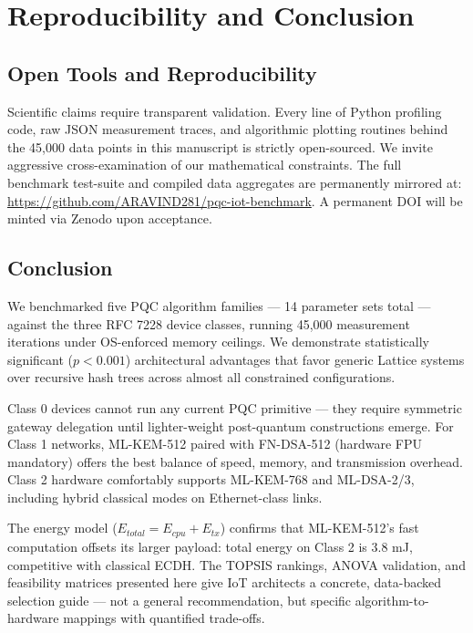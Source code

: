 \section{Reproducibility and Conclusion}
\label{sec:conclusion}

\subsection{Open Tools and Reproducibility}
Scientific claims require transparent validation. Every line of Python profiling code, raw JSON measurement traces, and algorithmic plotting routines behind the 45,000 data points in this manuscript is strictly open-sourced. We invite aggressive cross-examination of our mathematical constraints. The full benchmark test-suite and compiled data aggregates are permanently mirrored at: \url{https://github.com/ARAVIND281/pqc-iot-benchmark}. A permanent DOI will be minted via Zenodo upon acceptance.

\subsection{Conclusion}
We benchmarked five PQC algorithm families — 14 parameter sets total — against the three RFC 7228 device classes, running 45,000 measurement iterations under OS-enforced memory ceilings. We demonstrate statistically significant ($p<0.001$) architectural advantages that favor generic Lattice systems over recursive hash trees across almost all constrained configurations.

Class 0 devices cannot run any current PQC primitive — they require symmetric gateway delegation until lighter-weight post-quantum constructions emerge. For Class 1 networks, ML-KEM-512 paired with FN-DSA-512 (hardware FPU mandatory) offers the best balance of speed, memory, and transmission overhead. Class 2 hardware comfortably supports ML-KEM-768 and ML-DSA-2/3, including hybrid classical modes on Ethernet-class links.

The energy model ($E_{total} = E_{cpu} + E_{tx}$) confirms that ML-KEM-512's fast computation offsets its larger payload: total energy on Class 2 is 3.8 mJ, competitive with classical ECDH. The TOPSIS rankings, ANOVA validation, and feasibility matrices presented here give IoT architects a concrete, data-backed selection guide — not a general recommendation, but specific algorithm-to-hardware mappings with quantified trade-offs.
